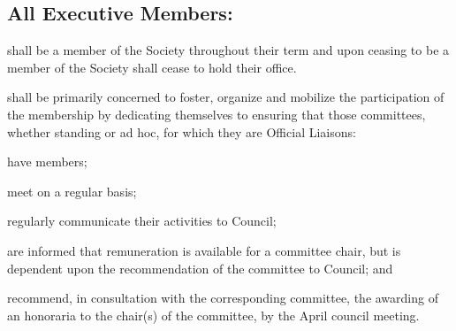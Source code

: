 \subsection [The Executive (General)]{All Executive Members:}
\begin{longenum}[ label*=\thesubsection.\arabic*., align=left]
	\item shall be a member of the Society throughout their term and upon ceasing to be a member of the Society shall cease to hold their office.
    \item shall be primarily concerned to foster, organize and mobilize the participation of the membership by dedicating themselves to ensuring that those committees, whether standing  or ad hoc, for which they are Official Liaisons:
   		\begin{longenum}[ label*=\arabic*., align=left]
		\item have members;
   		\item meet on a regular basis;
        		\item regularly communicate their activities to Council;
		\item are informed that remuneration is available for a committee chair, but is dependent upon the recommendation of the committee to Council; and
   		\item recommend, in consultation with the corresponding committee, the awarding of an honoraria to the chair(s) of the committee, by the April council meeting.   		
	\end{longenum}
	

\end{longenum}
